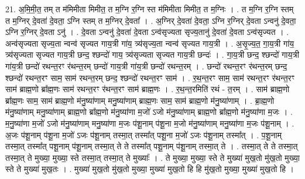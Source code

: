 \documentclass[17pt]{extarticle}
\begin{document}
21. अ॒मि॒मी॒त॒ तम् त म॑मिमीता मिमीत॒ त म॒ग्नि र॒ग्नि स्त म॑मिमीता मिमीत॒ त म॒ग्निः । . त म॒ग्नि र॒ग्नि स्तम् त म॒ग्निर् दे॒वता॑ दे॒वता॒ ऽग्नि स्तम् त म॒ग्निर् दे॒वता᳚ । . अ॒ग्निर् दे॒वता॑ दे॒वता॒ ऽग्नि र॒ग्निर् दे॒वता ऽन्वनु॑ दे॒वता॒ ऽग्नि र॒ग्निर् दे॒वता ऽनु॑ । . दे॒वता ऽन्वनु॑ दे॒वता॑ दे॒वता ऽन्व॑सृज्यता सृज्य॒तानु॑ दे॒वता॑ दे॒वता ऽन्व॑सृज्यत । . अन्व॑सृज्यता सृज्य॒ता न्वन्व॑ सृज्यत गाय॒त्री गा॑य॒ त्र्य॑सृज्य॒ता न्वन्व॑ सृज्यत गाय॒त्री । . अ॒सृ॒ज्य॒त॒ गा॒य॒त्री गा॑य॒ त्र्य॑सृज्यता सृज्यत गाय॒त्री छन्द॒ श्छन्दो॑ गाय॒ त्र्य॑सृज्यता सृज्यत गाय॒त्री छन्दः॑ । . गा॒य॒त्री छन्द॒ श्छन्दो॑ गाय॒त्री गा॑य॒त्री छन्दो॑ रथन्त॒रꣳ र॑थन्त॒रम् छन्दो॑ गाय॒त्री गा॑य॒त्री छन्दो॑ रथन्त॒रम् । . छन्दो॑ रथन्त॒रꣳ र॑थन्त॒रम् छन्द॒ श्छन्दो॑ रथन्त॒रꣳ साम॒ साम॑ रथन्त॒रम् छन्द॒ श्छन्दो॑ रथन्त॒रꣳ साम॑ । . र॒थ॒न्त॒रꣳ साम॒ साम॑ रथन्त॒रꣳ र॑थन्त॒रꣳ साम॑ ब्राह्म॒णो ब्रा᳚ह्म॒णः साम॑ रथन्त॒रꣳ र॑थन्त॒रꣳ साम॑ ब्राह्म॒णः । . र॒थ॒न्त॒रमिति॑ रथं - त॒रम् । . साम॑ ब्राह्म॒णो ब्रा᳚ह्म॒णः साम॒ साम॑ ब्राह्म॒णो म॑नु॒ष्या॑णाम् मनु॒ष्या॑णाम् ब्राह्म॒णः साम॒ साम॑ ब्राह्म॒णो म॑नु॒ष्या॑णाम् । . ब्रा॒ह्म॒णो म॑नु॒ष्या॑णाम् मनु॒ष्या॑णाम् ब्राह्म॒णो ब्रा᳚ह्म॒णो म॑नु॒ष्या॑णा म॒जो॑ ऽजो म॑नु॒ष्या॑णाम् ब्राह्म॒णो ब्रा᳚ह्म॒णो म॑नु॒ष्या॑णा म॒जः । . म॒नु॒ष्या॑णा म॒जो॑ ऽजो म॑नु॒ष्या॑णाम् मनु॒ष्या॑णा म॒जः प॑शू॒नाम् प॑शू॒ना म॒जो म॑नु॒ष्या॑णाम् मनु॒ष्या॑णा म॒जः प॑शू॒नाम् । . अ॒जः प॑शू॒नाम् प॑शू॒ना म॒जो॑ ऽजः प॑शू॒नाम् तस्मा॒त् तस्मा᳚त् पशू॒ना म॒जो॑ ऽजः प॑शू॒नाम् तस्मा᳚त् । . प॒शू॒नाम् तस्मा॒त् तस्मा᳚त् पशू॒नाम् प॑शू॒नाम् तस्मा॒त् ते ते तस्मा᳚त् पशू॒नाम् प॑शू॒नाम् तस्मा॒त् ते । . तस्मा॒त् ते ते तस्मा॒त् तस्मा॒त् ते मुख्या॒ मुख्या॒ स्ते तस्मा॒त् तस्मा॒त् ते मुख्याः᳚ । . ते मुख्या॒ मुख्या॒ स्ते ते मुख्या॑ मुख॒तो मु॑ख॒तो मुख्या॒ स्ते ते मुख्या॑ मुख॒तः । . मुख्या॑ मुख॒तो मु॑ख॒तो मुख्या॒ मुख्या॑ मुख॒तो हि हि मु॑ख॒तो मुख्या॒ मुख्या॑ मुख॒तो हि । \newline
\end{document}
